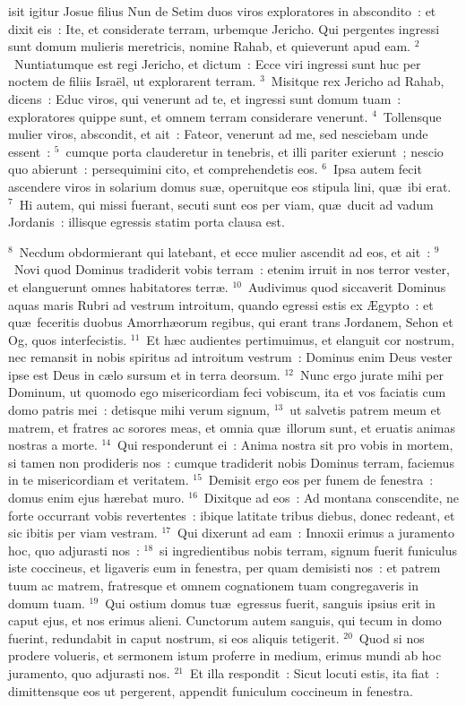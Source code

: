 \bchapter
{}isit igitur Josue filius Nun de Setim duos viros exploratores in abscondito~: et dixit eis~: Ite, et considerate terram, urbemque Jericho. Qui pergentes ingressi sunt domum mulieris meretricis, nomine Rahab, et quieverunt apud eam.
${}^{2}$~Nuntiatumque est regi Jericho, et dictum~: Ecce viri ingressi sunt huc per noctem de filiis Isra\"el, ut explorarent terram.
${}^{3}$~Misitque rex Jericho ad Rahab, dicens~: Educ viros, qui venerunt ad te, et ingressi sunt domum tuam~: exploratores quippe sunt, et omnem terram considerare venerunt.
${}^{4}$~Tollensque mulier viros, abscondit, et ait~: Fateor, venerunt ad me, sed nesciebam unde essent~:
${}^{5}$~cumque porta clauderetur in tenebris, et illi pariter exierunt~; nescio quo abierunt~: persequimini cito, et comprehendetis eos.
${}^{6}$~Ipsa autem fecit ascendere viros in solarium domus su\ae , operuitque eos stipula lini, qu\ae\ ibi erat.
${}^{7}$~Hi autem, qui missi fuerant, secuti sunt eos per viam, qu\ae\ ducit ad vadum Jordanis~: illisque egressis statim porta clausa est.


${}^{8}$~Necdum obdormierant qui latebant, et ecce mulier ascendit ad eos, et ait~:
${}^{9}$~Novi quod Dominus tradiderit vobis terram~: etenim irruit in nos terror vester, et elanguerunt omnes habitatores terr\ae .
${}^{10}$~Audivimus quod siccaverit Dominus aquas maris Rubri ad vestrum introitum, quando egressi estis ex \AE gypto~: et qu\ae\ feceritis duobus Amorrh\ae orum regibus, qui erant trans Jordanem, Sehon et Og, quos interfecistis.
${}^{11}$~Et h\ae c audientes pertimuimus, et elanguit cor nostrum, nec remansit in nobis spiritus ad introitum vestrum~: Dominus enim Deus vester ipse est Deus in c\ae lo sursum et in terra deorsum.
${}^{12}$~Nunc ergo jurate mihi per Dominum, ut quomodo ego misericordiam feci vobiscum, ita et vos faciatis cum domo patris mei~: detisque mihi verum signum,
${}^{13}$~ut salvetis patrem meum et matrem, et fratres ac sorores meas, et omnia qu\ae\ illorum sunt, et eruatis animas nostras a morte.
${}^{14}$~Qui responderunt ei~: Anima nostra sit pro vobis in mortem, si tamen non prodideris nos~: cumque tradiderit nobis Dominus terram, faciemus in te misericordiam et veritatem.
${}^{15}$~Demisit ergo eos per funem de fenestra~: domus enim ejus h\ae rebat muro.
${}^{16}$~Dixitque ad eos~: Ad montana conscendite, ne forte occurrant vobis revertentes~: ibique latitate tribus diebus, donec redeant, et sic ibitis per viam vestram.
${}^{17}$~Qui dixerunt ad eam~: Innoxii erimus a juramento hoc, quo adjurasti nos~:
${}^{18}$~si ingredientibus nobis terram, signum fuerit funiculus iste coccineus, et ligaveris eum in fenestra, per quam demisisti nos~: et patrem tuum ac matrem, fratresque et omnem cognationem tuam congregaveris in domum tuam.
${}^{19}$~Qui ostium domus tu\ae\ egressus fuerit, sanguis ipsius erit in caput ejus, et nos erimus alieni. Cunctorum autem sanguis, qui tecum in domo fuerint, redundabit in caput nostrum, si eos aliquis tetigerit.
${}^{20}$~Quod si nos prodere volueris, et sermonem istum proferre in medium, erimus mundi ab hoc juramento, quo adjurasti nos.
${}^{21}$~Et illa respondit~: Sicut locuti estis, ita fiat~: dimittensque eos ut pergerent, appendit funiculum coccineum in fenestra.


